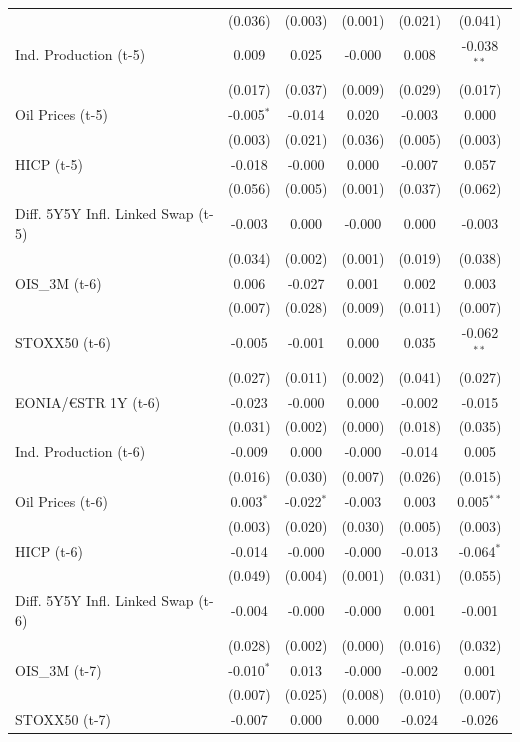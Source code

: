 \begin{longtable}[t]{lccccc}
 & (0.036) & (0.003) & (0.001) & (0.021) & (0.041)\\
Ind. Production (t-5) & 0.009 & 0.025 & -0.000 & 0.008 & -0.038$^{**}$\\
 & (0.017) & (0.037) & (0.009) & (0.029) & (0.017)\\
Oil Prices (t-5) & -0.005$^{*}$ & -0.014 & 0.020 & -0.003 & 0.000\\
 & (0.003) & (0.021) & (0.036) & (0.005) & (0.003)\\
HICP (t-5) & -0.018 & -0.000 & 0.000 & -0.007 & 0.057\\
 & (0.056) & (0.005) & (0.001) & (0.037) & (0.062)\\
Diff. 5Y5Y Infl. Linked Swap (t-5) & -0.003 & 0.000 & -0.000 & 0.000 & -0.003\\
 & (0.034) & (0.002) & (0.001) & (0.019) & (0.038)\\
OIS\_3M (t-6) & 0.006 & -0.027 & 0.001 & 0.002 & 0.003\\
 & (0.007) & (0.028) & (0.009) & (0.011) & (0.007)\\
STOXX50 (t-6) & -0.005 & -0.001 & 0.000 & 0.035 & -0.062$^{**}$\\
 & (0.027) & (0.011) & (0.002) & (0.041) & (0.027)\\
EONIA/€STR 1Y (t-6) & -0.023 & -0.000 & 0.000 & -0.002 & -0.015\\
 & (0.031) & (0.002) & (0.000) & (0.018) & (0.035)\\
Ind. Production (t-6) & -0.009 & 0.000 & -0.000 & -0.014 & 0.005\\
 & (0.016) & (0.030) & (0.007) & (0.026) & (0.015)\\
Oil Prices (t-6) & 0.003$^{*}$ & -0.022$^{*}$ & -0.003 & 0.003 & 0.005$^{**}$\\
 & (0.003) & (0.020) & (0.030) & (0.005) & (0.003)\\
HICP (t-6) & -0.014 & -0.000 & -0.000 & -0.013 & -0.064$^{*}$\\
 & (0.049) & (0.004) & (0.001) & (0.031) & (0.055)\\
Diff. 5Y5Y Infl. Linked Swap (t-6) & -0.004 & -0.000 & -0.000 & 0.001 & -0.001\\
 & (0.028) & (0.002) & (0.000) & (0.016) & (0.032)\\
OIS\_3M (t-7) & -0.010$^{*}$ & 0.013 & -0.000 & -0.002 & 0.001\\
 & (0.007) & (0.025) & (0.008) & (0.010) & (0.007)\\
STOXX50 (t-7) & -0.007 & 0.000 & 0.000 & -0.024 & -0.026\\

\end{longtable}
